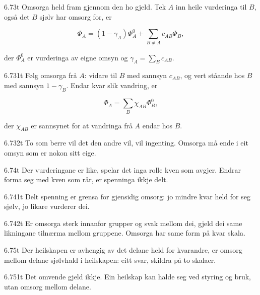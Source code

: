 \begin{formproposition}{6.73}{t}
Omsorga held fram gjennom den ho gjeld. Tek \(A\) inn heile vurderinga til \(B\), også det \(B\) sjølv har omsorg for, er

\[
\Phi_A=(1-\gamma_A)\Phi^0_A+\sum_{B\ne A}c_{AB}\Phi_B,
\]

der \(\Phi^0_A\) er vurderinga av eigne omsyn og \(\gamma_A=\sum_Bc_{AB}\).
\end{formproposition}

\begin{formproposition}{6.731}{t}
Følg omsorga frå \(A\): vidare til \(B\) med sannsyn \(c_{AB}\), og vert ståande hos \(B\) med sannsyn \(1-\gamma_B\). Endar kvar slik vandring, er

\[
\Phi_A=\sum_B\chi_{AB}\Phi^0_B,
\]

der \(\chi_{AB}\) er sannsynet for at vandringa frå \(A\) endar hos \(B\).
\end{formproposition}

\begin{formproposition}{6.732}{t}
To som berre vil det den andre vil, vil ingenting. Omsorga må ende i eit omsyn som er nokon sitt eige.
\end{formproposition}

\begin{formproposition}{6.74}{t}
Der vurderingane er like, spelar det inga rolle kven som avgjer. Endrar forma seg med kven som rår, er spenninga ikkje delt.
\end{formproposition}

\begin{formproposition}{6.741}{t}
Delt spenning er grensa for gjensidig omsorg: jo mindre kvar held for seg sjølv, jo likare vurderer dei.
\end{formproposition}

\begin{formproposition}{6.742}{t}
Er omsorga sterk innanfor grupper og svak mellom dei, gjeld dei same likningane tilnærma mellom gruppene. Omsorga har same form på kvar skala.
\end{formproposition}

\begin{formproposition}{6.75}{t}
Der heilskapen er avhengig av det delane held for kvarandre, er omsorg mellom delane sjølvhald i heilskapen: eitt svar, skildra på to skalaer.
\end{formproposition}

\begin{formproposition}{6.751}{t}
Det omvende gjeld ikkje. Ein heilskap kan halde seg ved styring og bruk, utan omsorg mellom delane.
\end{formproposition}

